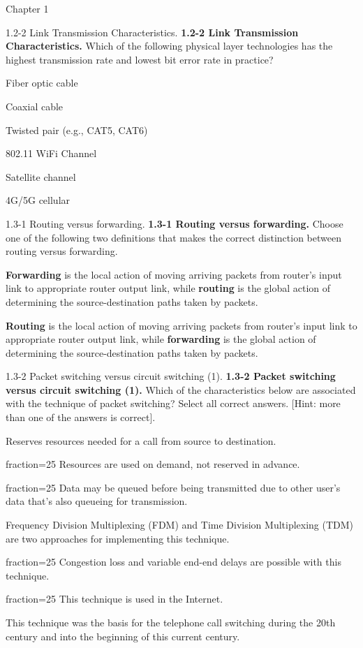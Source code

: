 \documentclass[a4paper]{article}
\begin{document}
\begin{quiz}{Chapter 1}
\begin{multi}[points=1,shuffle=true]{1.2-2 Link Transmission Characteristics.}
\textbf{1.2-2 Link Transmission Characteristics.}
Which of the following physical layer technologies has the highest transmission rate and lowest bit error rate in practice?
\item* Fiber optic cable
\item Coaxial cable
\item Twisted pair (e.g., CAT5, CAT6)
\item 802.11 WiFi Channel
\item Satellite channel
\item 4G/5G cellular
\end{multi}

\begin{multi}[points=1,shuffle=true]{1.3-1 Routing versus forwarding.}
\textbf{1.3-1 Routing versus forwarding.} 
Choose one of the following two definitions that makes the correct distinction between routing versus forwarding.
\item* \textbf{Forwarding} is the local action of moving arriving packets from router's input link to appropriate router output link, while \textbf{routing} is the global action of determining the source-destination paths taken by packets.
\item \textbf{Routing} is the local action of moving arriving packets from router's input link to appropriate router output link, while \textbf{forwarding} is the global action of determining the source-destination paths taken by packets.
\end{multi}

\begin{multi}[points=1,shuffle=true,multiple]{1.3-2 Packet switching versus circuit switching (1).}
\textbf{1.3-2 Packet switching versus circuit switching (1).} 
Which of the characteristics below are associated with the technique of packet switching? Select all correct answers. [Hint: more than one of the answers is correct].
\item Reserves resources needed for a call from source to destination.
\item[fraction=25] Resources are used on demand, not reserved in advance.
\item[fraction=25] Data may be queued before being transmitted due to other user's data that's also queueing for transmission.
\item Frequency Division Multiplexing (FDM) and Time Division Multiplexing (TDM) are two approaches for implementing this technique.
\item[fraction=25] Congestion loss and variable end-end delays are possible with this technique.
\item[fraction=25] This technique is used in the Internet.
\item This technique was the basis for the telephone call switching during the 20th century and into the beginning of this current century.
\end{multi}


\end{quiz}
\end{document}
